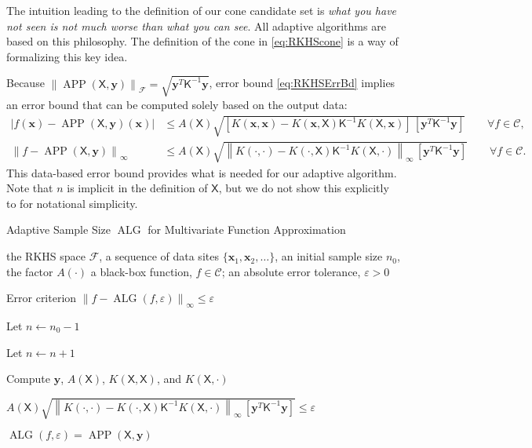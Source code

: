 \documentclass[]{mcom-l}
\theoremstyle{remark}
\DeclareMathOperator{\ALG}{ALG}
\DeclareMathOperator{\APP}{APP}
\newcommand{\mK}{\mathsf{K}}
\newcommand{\mX}{\mathsf{X}}
\newcommand{\bx}{{\boldsymbol{x}}}
\newcommand{\by}{{\boldsymbol{y}}}
\newcommand{\cc}{\mathcal{C}}
\newcommand{\calc}{{\mathcal{C}}}
\newcommand{\calf}{{\mathcal{F}}}
\def\abs#1{\ensuremath{\left \lvert #1 \right \rvert}}
\newcommand{\norm}[2][{}]{\ensuremath{\left \lVert #2 \right \rVert}_{#1}}
\newcommand{\bignorm}[2][{}]{\ensuremath{\bigl \lVert #2 \bigr \rVert}_{#1}}
\begin{document}
The intuition leading to the definition of our cone candidate set is \emph{what you have not seen is not much worse than what you can see}. All adaptive algorithms are based on this philosophy. The definition of the cone in \eqref{eq:RKHScone} is a way of formalizing this key idea. 

Because $\bignorm[\calf]{\APP(\mX,\by)} = \sqrt{\by^T \mK^{-1} \by}$, error bound \eqref{eq:RKHSErrBd} implies an error bound that can be computed solely based on the output data: 
\begin{subequations} \label{eq:DataErrBd}
\begin{align}
\label{eq:DataErrBdA}
    \abs{f(\bx) - \APP(\mX,\by)(\bx)} & \le   A(\mX) \sqrt{[K(\bx,\bx) - K(\bx,\mX) \mK^{-1} K(\mX,\bx) ] \, [\by^T \mK^{-1} \by] } \qquad \forall f \in \calc, \\
    \label{eq:DataErrBdB}
    \norm[\infty]{f - \APP(\mX,\by)} & \le   A(\mX) \sqrt{\norm[\infty]{K(\cdot,\cdot) - K(\cdot,\mX) \mK^{-1} K(\mX,\cdot)} \, [\by^T \mK^{-1} \by] } \qquad \forall f \in \calc.
\end{align}
\end{subequations}
This data-based error bound provides what is needed for our adaptive algorithm.  Note that $n$ is implicit in the definition of $\mX$, but we do not show this explicitly to for notational simplicity.

\begin{algorithm}[H]
\caption{Adaptive Sample Size $\ALG$ for Multivariate Function Approximation \label{alg:basicadapt}}
	\begin{algorithmic}
	\PARAM the RKHS space $\calf$, a sequence of data sites $\{\bx_1, \bx_2, \ldots \}$, an initial sample size $n_0$, the factor $A(\cdot)$
	\INPUT a black-box function, $f \in \cc$; an absolute error tolerance, $\varepsilon>0$

    \Ensure Error criterion $\norm[\infty]{f - \ALG(f,\varepsilon)} \le \varepsilon$

   \State Let $n \leftarrow n_0 -1$

\Repeat

\State Let $n \leftarrow n + 1$

\State Compute $\by$, $A(\mX)$, $K(\mX,\mX)$, and $K(\mX,\cdot)$

\Until $A(\mX) \sqrt{\norm[\infty]{K(\cdot,\cdot) - K(\cdot,\mX) \mK^{-1} K(\mX,\cdot)} \, [\by^T \mK^{-1} \by] }  \le \varepsilon$

\RETURN $\ALG(f,\varepsilon) = \APP(\mX,\by)$

\end{algorithmic}
\end{algorithm}
\end{document}
